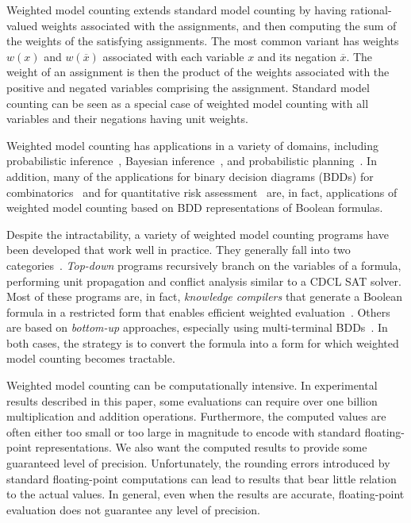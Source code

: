 \documentclass[letterpaper,USenglish,cleveref, autoref, thm-restate]{lipics-v2021}
\newcommand{\obar}[1]{\overline{#1}}
\begin{document}
Weighted model counting extends standard model counting by having
rational-valued weights associated with the assignments, and then
computing the sum of the weights of the satisfying assignments.  The
most common variant has weights $w(x)$ and $w(\obar{x})$
associated with each variable $x$ and its negation $\obar{x}$.  The
weight of an assignment is then the product of the weights associated
with the positive and negated variables comprising the assignment.
Standard model counting can be seen as a special case of weighted model
counting with all variables and their negations having unit weights.

Weighted model counting has applications in a variety of domains,
including probabilistic inference~\cite{chavira:ai:2008}, Bayesian
inference~\cite{sang:aaai:2005}, and probabilistic
planning~\cite{domshlak:jair:2007}.  In addition, many of the
applications for binary decision diagrams (BDDs) for
combinatorics~\cite{knuth:bdd:2011} and for quantitative risk
assessment~\cite{xing:wiley:2015} are, in fact, applications of
weighted model counting based on BDD representations of Boolean
formulas.

Despite the intractability, a variety of weighted model counting
programs have been developed that work well in practice.  They
generally fall into two categories~\cite{shaw:kr:2024}. \emph{Top-down} programs
recursively branch on the variables of a formula, performing unit
propagation and conflict analysis similar to a CDCL SAT solver.  Most
of these programs are, in fact, \emph{knowledge compilers} that
generate a Boolean formula in a restricted form that enables efficient
weighted
evaluation~\cite{darwiche:aaai:2002,darwiche:ecai:2004,lagniez:ijcai:2017,muise:cai:2012,oztok:cp:2014}.
Others are based on \emph{bottom-up} approaches, especially using
multi-terminal BDDs~\cite{dudek:aaai:2020,dudek:sat:2021}.  In both
cases, the strategy is to convert the formula into a form for which
weighted model counting becomes tractable.

Weighted model counting can be computationally intensive.  In
experimental results described in this paper, some evaluations can
require over one billion multiplication and addition operations.
Furthermore, the computed values are often either too small or too
large in magnitude to encode with standard floating-point
representations.  We also want the computed results to provide some
guaranteed level of precision.  Unfortunately, the rounding errors
introduced by standard floating-point computations can lead to results
that bear little relation to the actual values.  In general, even when the results are accurate,
floating-point evaluation does not guarantee any level of precision.
\end{document}
